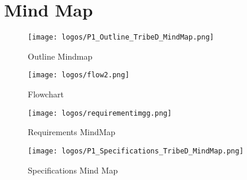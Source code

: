 \documentclass[table]{rapportCS}
\begin{document}
\clearpage


























\newpage
\section{Mind Map}\label{sec:mindmap} 
\begin{figure}[h]
    \centering
    \texttt{[image: logos/P1\_Outline\_TribeD\_MindMap.png]}
    \caption{Outline Mindmap}
    \label{fig:outlinemindmap}
\end{figure}
\begin{figure}
    \centering
    \texttt{[image: logos/flow2.png]}
    \caption{Flowchart}
    \label{fig:outlinemindmap}
\end{figure}
\begin{figure}[htbp]
  \centering
  \begin{adjustbox}{valign=c}
    \texttt{[image: logos/requirementimgg.png]} %
  \end{adjustbox}
  \caption{Requirements MindMap}
  \label{fig:reqmindmap}
\end{figure}
\begin{figure}
    \centering
    \texttt{[image: logos/P1\_Specifications\_TribeD\_MindMap.png]}
    \caption{Specifications Mind Map}
    \label{fig:specsmindmap}
\end{figure}
\end{document}

